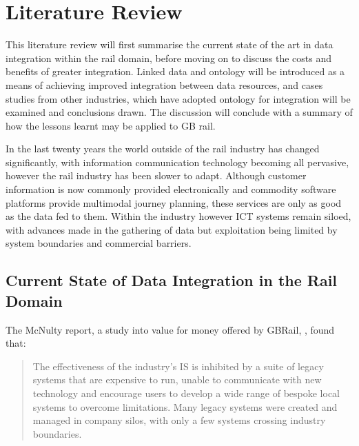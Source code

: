 \chapter{Literature Review}\label{ch:litreview}
This literature review will first summarise the current state of the art in data integration within the rail domain, before moving on to discuss the costs and benefits of greater integration. Linked data and ontology will be introduced as a means of achieving improved integration between data resources, and cases studies from other industries, which have adopted ontology for integration will be examined and conclusions drawn. The discussion will conclude with a summary of how the lessons learnt may be applied to GB rail.

In the last twenty years the world outside of the rail industry has changed significantly, with information communication technology becoming all pervasive, however the rail industry has been slower to adapt. Although customer information is now commonly provided electronically and commodity software platforms provide multimodal journey planning, these services are only as good as the data fed to them. Within the industry however ICT systems remain siloed, with advances made in the gathering of data but exploitation being limited by system boundaries and commercial barriers. 

\section{Current State of Data Integration in the Rail Domain}
\label{state}

The McNulty report, a study into value for money offered by GBRail, \citep{DepartmentforTransport2011}, found that:
\begin{quote}
    The effectiveness of the industry’s IS is inhibited by a suite of legacy systems that are expensive to run, unable to communicate with new technology and encourage users to develop a wide range of bespoke local systems to overcome limitations. Many legacy systems were created and managed in company silos, with only a few systems crossing industry boundaries.
\end{quote}

